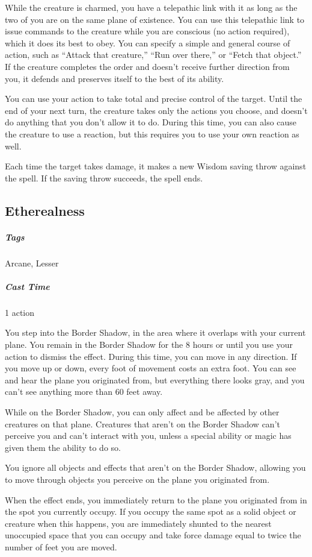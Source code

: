 While the creature is charmed, you have a telepathic link with it as long as the two of you are on the same plane of existence. You can use this telepathic link to issue commands to the creature while you are conscious (no action required), which it does its best to obey. You can specify a simple and general course of action, such as “Attack that creature,” “Run over there,” or “Fetch that object.” If the creature completes the order and doesn’t receive further direction from you, it defends and preserves itself to the best of its ability.

You can use your action to take total and precise control of the target. Until the end of your next turn, the creature takes only the actions you choose, and doesn’t do anything that you don’t allow it to do. During this time, you can also cause the creature to use a reaction, but this requires you to use your own reaction as well.

Each time the target takes damage, it makes a new Wisdom saving throw against the spell. If the saving throw succeeds, the spell ends.

\subsection{Etherealness}
\subparagraph*{Tags} Arcane, Lesser
\subparagraph*{Cast Time} 1 action

You step into the Border Shadow, in the area where it overlaps with your current plane. You remain in the Border Shadow for the 8 hours or until you use your action to dismiss the effect. During this time, you can move in any direction. If you move up or down, every foot of movement costs an extra foot. You can see and hear the plane you originated from, but everything there looks gray, and you can’t see anything more than 60 feet away.

While on the  Border Shadow, you can only affect and be affected by other creatures on that plane. Creatures that aren’t on the Border Shadow can’t perceive you and can’t interact with you, unless a special ability or magic has given them the ability to do so.

You ignore all objects and effects that aren’t on the Border Shadow, allowing you to move through objects you perceive on the plane you originated from.

When the effect ends, you immediately return to the plane you originated from in the spot you currently occupy. If you occupy the same spot as a solid object or creature when this happens, you are immediately shunted to the nearest unoccupied space that you can occupy and take force damage equal to twice the number of feet you are moved.

